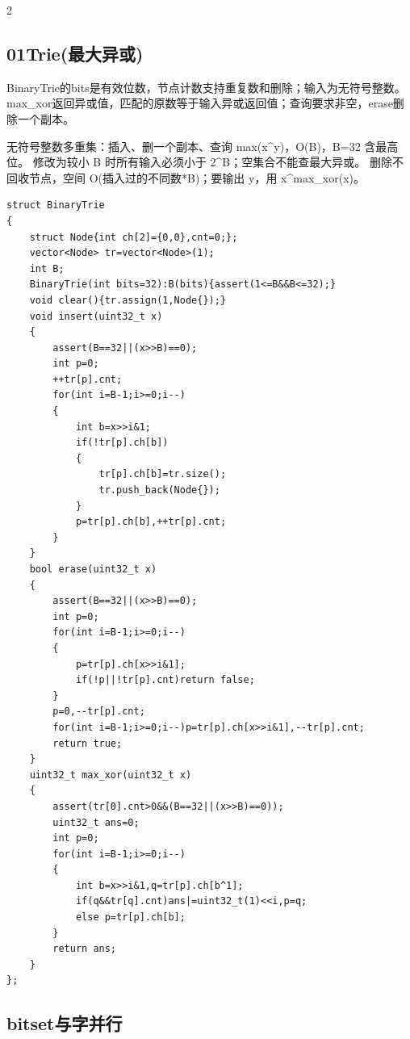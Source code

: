 \documentclass[UTF8,fontset=fandol,a4paper,twoside]{ctexart}
\newcommand{\note}[1]{{\fontsize{10}{12}\selectfont #1\par}}
\begin{document}
\begin{multicols}{2}
\subsection{01Trie(最大异或)}

\note{BinaryTrie的bits是有效位数，节点计数支持重复数和删除；输入为无符号整数。max\_xor返回异或值，匹配的原数等于输入异或返回值；查询要求非空，erase删除一个副本。}
\note{无符号整数多重集：插入、删一个副本、查询 max(\allowbreak{}x\textasciicircum{}y)\allowbreak{}，O(\allowbreak{}B)\allowbreak{}，B=\allowbreak{}32 含最高位。 修改为较小 B 时所有输入必须小于 2\textasciicircum{}B；空集合不能查最大异或。 删除不回收节点，空间 O(\allowbreak{}插入过的不同数*B)\allowbreak{}；要输出 y，用 x\textasciicircum{}max\_xor(\allowbreak{}x)\allowbreak{}。}
\begin{lstlisting}
struct BinaryTrie
{
    struct Node{int ch[2]={0,0},cnt=0;};
    vector<Node> tr=vector<Node>(1);
    int B;
    BinaryTrie(int bits=32):B(bits){assert(1<=B&&B<=32);}
    void clear(){tr.assign(1,Node{});}
    void insert(uint32_t x)
    {
        assert(B==32||(x>>B)==0);
        int p=0;
        ++tr[p].cnt;
        for(int i=B-1;i>=0;i--)
        {
            int b=x>>i&1;
            if(!tr[p].ch[b])
            {
                tr[p].ch[b]=tr.size();
                tr.push_back(Node{});
            }
            p=tr[p].ch[b],++tr[p].cnt;
        }
    }
    bool erase(uint32_t x)
    {
        assert(B==32||(x>>B)==0);
        int p=0;
        for(int i=B-1;i>=0;i--)
        {
            p=tr[p].ch[x>>i&1];
            if(!p||!tr[p].cnt)return false;
        }
        p=0,--tr[p].cnt;
        for(int i=B-1;i>=0;i--)p=tr[p].ch[x>>i&1],--tr[p].cnt;
        return true;
    }
    uint32_t max_xor(uint32_t x)
    {
        assert(tr[0].cnt>0&&(B==32||(x>>B)==0));
        uint32_t ans=0;
        int p=0;
        for(int i=B-1;i>=0;i--)
        {
            int b=x>>i&1,q=tr[p].ch[b^1];
            if(q&&tr[q].cnt)ans|=uint32_t(1)<<i,p=q;
            else p=tr[p].ch[b];
        }
        return ans;
    }
};
\end{lstlisting}
\subsection{bitset与字并行}


\end{multicols}
\end{document}
